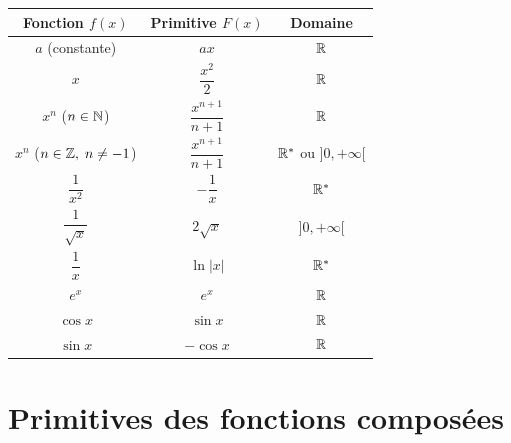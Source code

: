 \begin{propriete}
  \bigskip
  \begin{center}
  \renewcommand{\arraystretch}{2.4}
  \begin{tabular}{|c|c|c|}
    \hline
    \textbf{\color{navy}Fonction $f(x)$}
      & \textbf{\color{navy}Primitive $F(x)$}
      & \textbf{\color{navy}Domaine} \\
    \hline\hline
    $a$ \; (constante)
      & $ax$
      & $\mathbb{R}$ \\
    \hline
    $x$
      & $\dfrac{x^2}{2}$
      & $\mathbb{R}$ \\
    \hline
    $x^n$ \; ($n \in \mathbb{N}$)
      & $\dfrac{x^{n+1}}{n+1}$
      & $\mathbb{R}$ \\
    \hline
    $x^n$ \; ($n \in \mathbb{Z},\; n \neq -1$)
      & $\dfrac{x^{n+1}}{n+1}$
      & $\mathbb{R}^*$ ou $]0,+\infty[$ \\
    \hline
    $\dfrac{1}{x^2}$
      & $-\dfrac{1}{x}$
      & $\mathbb{R}^*$ \\
    \hline
    $\dfrac{1}{\sqrt{x}}$
      & $2\sqrt{x}$
      & $]0,+\infty[$ \\
    \hline
    $\dfrac{1}{x}$
      & $\ln|x|$
      & $\mathbb{R}^*$ \\
    \hline
    $e^x$
      & $e^x$
      & $\mathbb{R}$ \\
    \hline
    $\cos x$
      & $\sin x$
      & $\mathbb{R}$ \\
    \hline
    $\sin x$
      & $-\cos x$
      & $\mathbb{R}$ \\
    \hline
  \end{tabular}
  \end{center}
\end{propriete}

\section{Primitives des fonctions compos\'{e}es}

